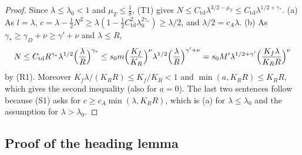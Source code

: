 \begin{proof}
Since $\lambda\le\lambda_0<1$ and $\mu_T\le\frac18$, (T1) gives $N\le C_{\mathrm{td}}\lambda^{3/2-\mu_T}\le
C_{\mathrm{td}}\lambda^{1/2+\gamma_*}$. (a) As $l=\lambda$, $c=\lambda-\frac12N^2\ge\lambda(1-\frac12C_{\mathrm{td}}^2\lambda_0^{2\gamma_*})
\ge\lambda/2$, and $\lambda/2=c_A\lambda$. (b) As $\gamma_*\ge\gamma_D+\nu\ge\gamma'+\nu$ and $\lambda\le R$,
\[
N\le C_{\mathrm{td}}R^{\gamma_*}\lambda^{1/2}\Bigl(\frac\lambda R\Bigr)^{\gamma_*}
\le s_0m\Bigl(\frac{K_f}{K_R}\Bigr)^{\nu}\lambda^{1/2}\Bigl(\frac\lambda R\Bigr)^{\gamma'+\nu}
=s_0M'\lambda^{1/2+\gamma'}\Bigl(\frac{K_f\lambda}{K_RR}\Bigr)^\nu
\]
by (R1). Moreover $K_f\lambda/(K_RR)\le K_f/K_R<1$ and $\min(a,K_RR)\le K_RR$, which gives the second inequality (also
for $a=0$). The last two sentences follow because (S1) asks for $c\ge c_A\min(\lambda,K_RR)$, which is (a) for
$\lambda\le\lambda_0$ and the assumption for $\lambda>\lambda_0$.
\end{proof}

\subsection{Proof of the heading lemma}\label{appC:heading}

